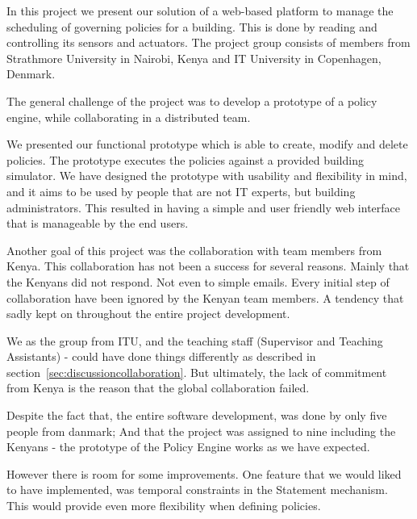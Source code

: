 In this project we present our solution of a web-based platform to manage the scheduling of governing policies for a building. This is done by reading and controlling its sensors and actuators. The project group consists of members from Strathmore University in Nairobi, Kenya and IT University in Copenhagen, Denmark.

The general challenge of the project was to develop a prototype of a policy engine, while collaborating in a distributed team. 

We presented our functional prototype which is able to create, modify and delete policies. The prototype executes the policies against a provided building simulator. We have designed the prototype with usability and flexibility in mind, and it aims to be used by people that are not IT experts, but building administrators. This resulted in having a simple and user friendly web interface that is manageable by the end users. 

Another goal of this project was the collaboration with team members from Kenya. This collaboration has not been a success for several reasons. Mainly that the Kenyans did not respond. Not even to simple emails. Every initial step of collaboration have been ignored by the Kenyan team members. A tendency that sadly kept on throughout the entire project development.

We as the group from ITU, and the teaching staff (Supervisor and Teaching Assistants) - could have done things differently as described in section~\ref{sec:discussioncollaboration}. But ultimately, the lack of commitment from Kenya is the reason that the global collaboration failed.

Despite the fact that, the entire software development, was done by only five people from danmark; And that the project was assigned to nine including the Kenyans  - the prototype of the Policy Engine works as we have expected. 

However there is room for some improvements. One feature that we would liked to have implemented, was temporal constraints in the Statement mechanism. This would provide even more flexibility when defining policies.




